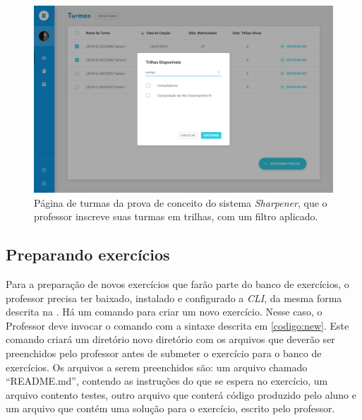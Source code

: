     \begin{figure}[htb]
    \centering
    \includegraphics[width=\linewidth]{images/mocks/turmaAddTrackSearch.png}
    \caption{Página de turmas da prova de conceito do sistema \emph{Sharpener}, 
    que o professor inscreve suas turmas em trilhas, com um filtro  aplicado.}%
    \label{fig:enroll_track2}
  \end{figure}


\subsection{Preparando exercícios}
Para a preparação de novos exercícios que farão parte do banco de exercícios, o professor precisa
ter baixado, instalado e configurado a \emph{CLI}, da mesma forma descrita na . Há um comando para criar um novo exercício. Nesse caso, o Professor deve invocar o comando com a sintaxe descrita em \cref{codigo:new}. Este comando criará um diretório novo diretório com os arquivos 
que deverão ser preenchidos pelo professor antes de submeter o exercício para o banco 
de exercícios. Os arquivos a serem preenchidos são: um arquivo chamado ``README.md'', contendo as instruções 
do que se espera no exercício, um arquivo contento testes, outro arquivo que conterá código produzido pelo aluno 
e um arquivo que contém uma solução para o exercício, escrito pelo professor.


